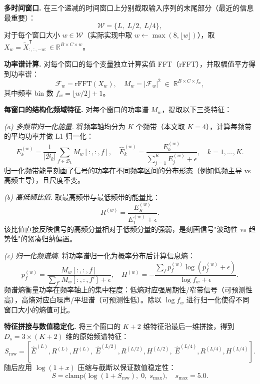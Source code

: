 \medskip\noindent\textbf{多时间窗口.}
在三个递减的时间窗口上分别截取输入序列的末尾部分（最近的信息最重要）：
\begin{equation}
  \mathcal{W} = \{L,\; L/2,\; L/4\},
\end{equation}
对于每个窗口大小 \(w \in \mathcal{W}\)（实际实现中取 \(w \gets \max(8, \lfloor w \rfloor)\)），取 \(X_w = \tilde{X}_{:, :, -w:}^{\mathsf{T}} \in \mathbb{R}^{B \times C \times w}\)。

\medskip\noindent\textbf{功率谱计算.}
对每个窗口的每个变量独立计算实值 FFT（rFFT），并取幅值平方得到功率谱：
\begin{equation}
  \mathcal{F}_w = \mathrm{rFFT}(X_w), \quad
  M_w = |\mathcal{F}_w|^2 \;\in\; \mathbb{R}^{B \times C \times f_w},
\end{equation}
其中频率 bin 数 \(f_w = \lfloor w/2 \rfloor + 1\)。

\medskip\noindent\textbf{每窗口的结构化频域特征.}
对每个窗口的功率谱 \(M_w\)，提取以下三类特征：

\emph{(a) 多频带归一化能量.} 将频率轴均分为 \(K\) 个频带（本文取 \(K = 4\)），计算每频带的平均功率并做 L1 归一化：
\begin{equation}
  E_k^{(w)} = \frac{1}{|\mathcal{B}_k|} \sum_{f \in \mathcal{B}_k} M_w[:,:,f], \quad
  \hat{E}_k^{(w)} = \frac{E_k^{(w)}}{\sum_{j=1}^{K} E_j^{(w)} + \epsilon}, \quad k=1,\dots,K.
\end{equation}
归一化频带能量刻画了信号的功率在不同频率区间的分布形态（例如低频主导 vs 高频主导），且尺度不变。

\emph{(b) 高低频比值.} 取最高频带与最低频带的能量比：
\begin{equation}
  R^{(w)} = \frac{E_K^{(w)}}{E_1^{(w)} + \epsilon}.
\end{equation}
该比值直接反映信号的高频分量相对于低频分量的强弱，是刻画信号"波动性 vs 趋势性"的紧凑归纳偏置。

\emph{(c) 归一化频谱熵.} 将功率谱归一化为概率分布后计算信息熵：
\begin{equation}
  p_f^{(w)} = \frac{M_w[:,:,f]}{\sum_{f'} M_w[:,:,f'] + \epsilon}, \quad
  H^{(w)} = -\frac{\sum_f p_f^{(w)} \log(p_f^{(w)} + \epsilon)}{\log f_w + \epsilon}.
\end{equation}
频谱熵衡量功率在频率轴上的集中程度：低熵对应强周期性/窄带信号（可预测性高），高熵对应白噪声/平坦谱（可预测性低）。除以 \(\log f_w\) 进行归一化使得不同窗口大小的熵值可比。

\medskip\noindent\textbf{特征拼接与数值稳定化.}
将三个窗口的 \(K+2\) 维特征沿最后一维拼接，得到 \(D_s = 3 \times (K+2)\) 维的原始频谱特征：
\begin{equation}
  S_{\text{raw}} = [\hat{E}^{(L)}, R^{(L)}, H^{(L)},\; \hat{E}^{(L/2)}, R^{(L/2)}, H^{(L/2)},\; \hat{E}^{(L/4)}, R^{(L/4)}, H^{(L/4)}].
\end{equation}
随后应用 \(\log(1+x)\) 压缩与截断以保证数值稳定性：
\begin{equation}
  S = \mathrm{clamp}\big(\log(1 + S_{\text{raw}}),\; 0,\; s_{\max}\big), \quad s_{\max}=5.0.
\end{equation}

